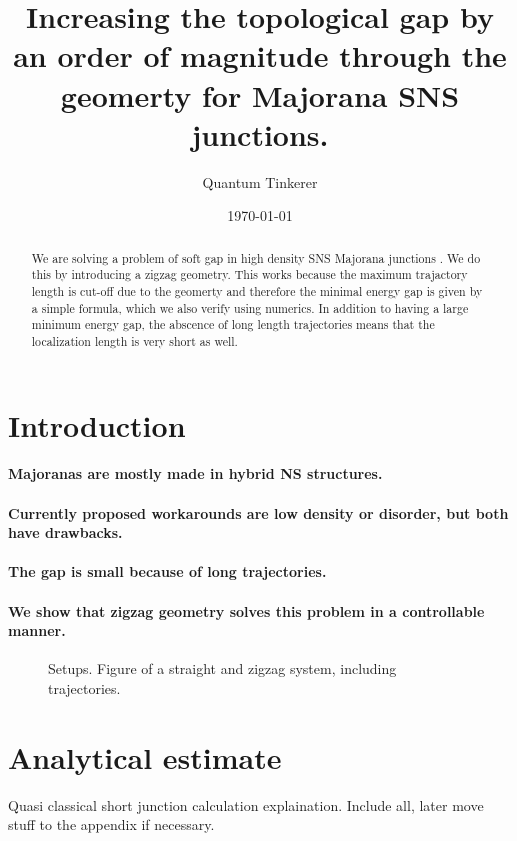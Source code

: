 \documentclass[english, twocolumn, 10pt, aps, superscriptaddress, floatfix, prb, citeautoscript]{revtex4-1}
\renewcommand{\comment}[2]{#2}
\renewcommand{\comment}{\paragraph}
\begin{document}
\title{Increasing the topological gap by an order of magnitude through the geomerty for Majorana SNS junctions.}

\author{Quantum Tinkerer}

\date{\today}

\begin{abstract}
We are solving a problem of soft gap in high density SNS Majorana junctions \cite{pientka2017topological}.
We do this by introducing a zigzag geometry.
This works because the maximum trajactory length is cut-off due to the geomerty and therefore the minimal energy gap is given by a simple formula, which we also verify using numerics.
In addition to having a large minimum energy gap, the abscence of long length trajectories means that the localization length is very short as well.
\end{abstract}

\maketitle


\section{Introduction}

\comment{Majoranas are mostly made in hybrid NS structures.}
\comment{Currently proposed workarounds are low density or disorder, but both have drawbacks.}
\comment{The gap is small because of long trajectories.}
\comment{We show that zigzag geometry solves this problem in a controllable manner.}

\begin{figure}[!htb]
\caption{Setups. Figure of a straight and zigzag system, including trajectories.
\label{fig:setup}}
\end{figure}


\section{Analytical estimate}

Quasi classical short junction calculation explaination.
Include all, later move stuff to the appendix if necessary.
\end{document}

